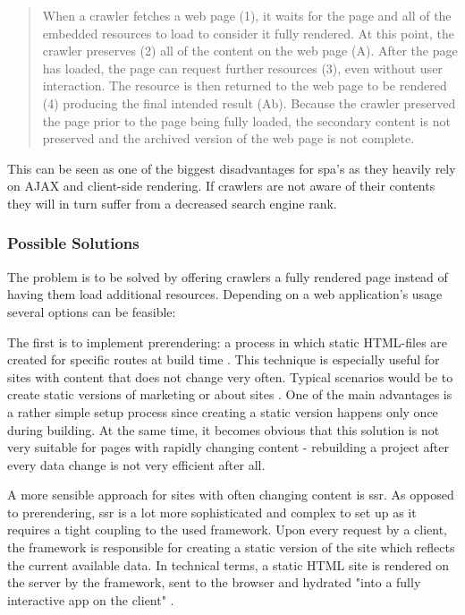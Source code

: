 \begin{quotation}
When a crawler fetches a web page (1), it waits for the page and all of the embedded resources to load to consider it fully rendered. At this point, the crawler preserves (2) all of the content on the web page (A). After the page has loaded, the page can request further resources (3), even without user interaction. The resource is then returned to the web page to be rendered (4) producing the final intended result (Ab). Because the crawler preserved the page prior to the page being fully loaded, the secondary content is not preserved and the archived version of the web page is not complete.
\end{quotation}

This can be seen as one of the biggest disadvantages for \acrshort{spa}'s as they heavily rely on AJAX and client-side rendering. If crawlers are not aware of their contents they will in turn suffer from a decreased search engine rank. 

\subsubsection{Possible Solutions}
The problem is to be solved by offering crawlers a fully rendered page instead of having them load additional resources. Depending on a web application's usage several options can be feasible:

The first is to implement prerendering: a process in which static HTML-files are created for specific routes at build time \cite{VueSSR:online}. This technique is especially useful for sites with content that does not change very often. Typical scenarios would be to create static versions of marketing or about sites \cite{VueSSR:online}. One of the main advantages is a rather simple setup process since creating a static version happens only once during building. At the same time, it becomes obvious that this solution is not very suitable for pages with rapidly changing content - rebuilding a project after every data change is not very efficient after all.

A more sensible approach for sites with often changing content is \acrfull{ssr}. As opposed to prerendering, \acrshort{ssr} is a lot more sophisticated and complex to set up as it requires a tight coupling to the used framework. Upon every request by a client, the framework is responsible for creating a static version of the site which reflects the current available data. In technical terms, a static HTML site is rendered on the server by the framework, sent to the browser and hydrated "into a fully interactive app on the client" \cite{VueSSR:online}.

